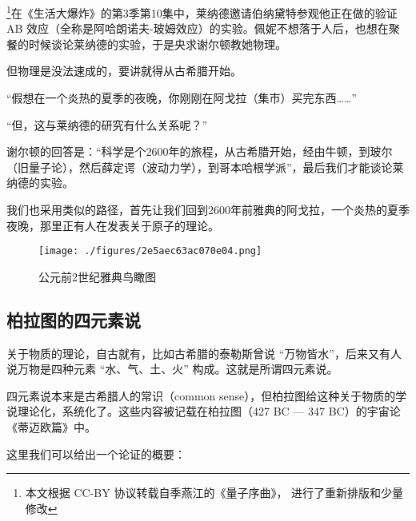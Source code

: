
\footnote{本文根据 CC-BY 协议转载自季燕江的《量子序曲》， 进行了重新排版和少量修改}在《生活大爆炸》的第3季第10集中，莱纳德邀请伯纳黛特参观他正在做的验证 AB 效应（全称是阿哈朗诺夫-玻姆效应）的实验。佩妮不想落于人后，也想在聚餐的时候谈论莱纳德的实验，于是央求谢尔顿教她物理。

但物理是没法速成的，要讲就得从古希腊开始。

“假想在一个炎热的夏季的夜晚，你刚刚在阿戈拉（集市）买完东西……”

“但，这与莱纳德的研究有什么关系呢？”

谢尔顿的回答是：“科学是个2600年的旅程，从古希腊开始，经由牛顿，到玻尔（旧量子论），然后薛定谔（波动力学），到哥本哈根学派”，最后我们才能谈论莱纳德的实验。

我们也采用类似的路径，首先让我们回到2600年前雅典的阿戈拉，一个炎热的夏季夜晚，那里正有人在发表关于原子的理论。

\begin{figure}[ht]
\centering
\texttt{[image: ./figures/2e5aec63ac070e04.png]}
\caption{公元前2世纪雅典鸟瞰图} \label{fig_AtomId_1}
\end{figure}

\subsection{柏拉图的四元素说}

关于物质的理论，自古就有，比如古希腊的泰勒斯曾说 “万物皆水”，后来又有人说万物是四种元素 “水、气、土、火” 构成。这就是所谓四元素说。

四元素说本来是古希腊人的常识（common sense），但柏拉图给这种关于物质的学说理论化，系统化了。这些内容被记载在柏拉图（427 BC — 347 BC）的宇宙论《蒂迈欧篇》中。

这里我们可以给出一个论证的概要：

